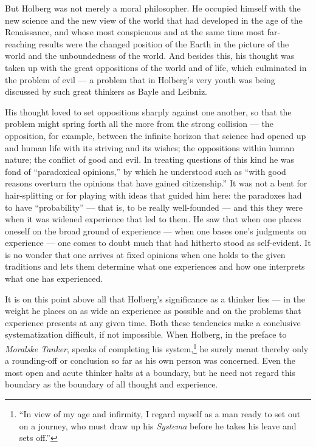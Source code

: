 \documentclass[12pt,a4paper]{book}
\newcommand{\opage}[1]{\marginnote{\footnotesize\textit{[#1]}}}
\begin{document}
But Holberg was not merely a moral philosopher. He occupied himself with the new
science and the new view of the world that had developed in the age of the
Renaissance, and whose most conspicuous and at the same time most far-reaching
results were the changed position of the Earth in the picture of the world and
the unboundedness of the world. And besides this, his thought was taken up with
the great oppositions of the world and of life, which culminated in the problem
of evil --- a problem that in Holberg's very youth was being discussed by such
great thinkers as Bayle and Leibniz.

His thought loved to set oppositions sharply against one another, so that the
problem might spring forth all the more from the strong collision --- the
opposition, for example, between the infinite horizon that science had opened up
and human life with its striving and its wishes; the oppositions within human
nature; the conflict of good \opage{5}and evil. In treating questions of this kind he was
fond of ``paradoxical opinions,'' by which he understood such as ``with good
reasons overturn the opinions that have gained citizenship.'' It was not a bent
for hair-splitting or for playing with ideas that guided him here: the paradoxes
had to have ``probability'' --- that is, to be really well-founded --- and this
they were when it was widened experience that led to them. He saw that when one
places oneself on the broad ground of experience --- when one bases one's
judgments on experience --- one comes to doubt much that had hitherto stood as
self-evident. It is no wonder that one arrives at fixed opinions when one holds
to the given traditions and lets them determine what one experiences and how one
interprets what one has experienced.

It is on this point above all that Holberg's significance as a thinker lies ---
in the weight he places on as wide an experience as possible and on the problems
that experience presents at any given time. Both these tendencies make a
conclusive systematization difficult, if not impossible. When Holberg, in the
preface to \emph{Moralske Tanker}, speaks of completing his system,\footnote{``In
view of my age and infirmity, I regard myself as a man ready to set out on a
journey, who must draw up his \emph{Systema} before he takes his leave and sets
off.''} he surely meant thereby only a rounding-off or conclusion so far as his
own person was concerned. Even the most open and acute thinker halts at a
boundary, but he need not regard this boundary as the boundary of all thought
and experience.
\end{document}
